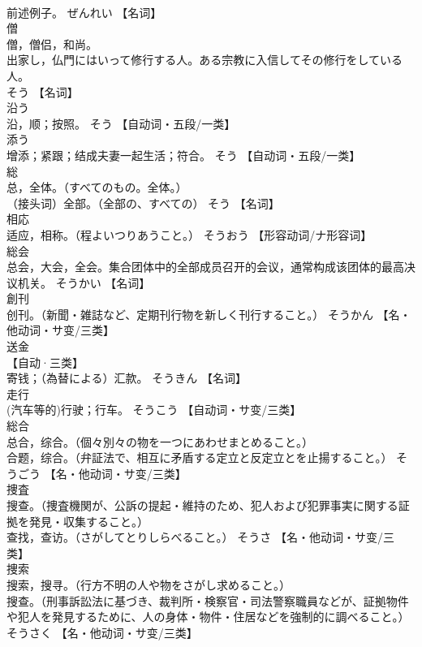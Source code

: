 \documentclass[8pt]{extreport}
\begin{document}
\begin{CJK}{UTF8}{min}
\\	前述例子。	ぜんれい		【名词】
\\	僧	
\\	僧，僧侣，和尚。
\\	出家し，仏門にはいって修行する人。ある宗教に入信してその修行をしている人。 
\\	そう		【名词】
\\	沿う	
\\	沿，顺；按照。	そう		【自动词・五段/一类】
\\	添う	
\\	增添；紧跟；结成夫妻一起生活；符合。	そう		【自动词・五段/一类】
\\	総	
\\	总，全体。（すべてのもの。全体。） 
\\	（接头词）全部。（全部の、すべての）	そう		【名词】
\\	相応	
\\	适应，相称。（程よいつりあうこと。）	そうおう		【形容动词/ナ形容词】
\\	総会	
\\	总会，大会，全会。集合团体中的全部成员召开的会议，通常构成该团体的最高决议机关。	そうかい		【名词】
\\	創刊	
\\	创刊。（新聞・雑誌など、定期刊行物を新しく刊行すること。）	そうかん		【名・他动词・サ变/三类】
\\	送金	
\\	【自动·三类】 
\\	寄钱；（為替による）汇款。	そうきん		【名词】
\\	走行	
\\	(汽车等的)行驶；行车。	そうこう		【自动词・サ变/三类】
\\	総合	
\\	总合，综合。（個々別々の物を一つにあわせまとめること。） 
\\	合题，综合。（弁証法で、相互に矛盾する定立と反定立とを止揚すること。）	そうごう		【名・他动词・サ变/三类】
\\	捜査	
\\	搜查。（捜査機関が、公訴の提起・維持のため、犯人および犯罪事実に関する証拠を発見・収集すること。） 
\\	查找，查访。（さがしてとりしらべること。）	そうさ		【名・他动词・サ变/三类】
\\	捜索	
\\	搜索，搜寻。（行方不明の人や物をさがし求めること。） 
\\	搜查。（刑事訴訟法に基づき、裁判所・検察官・司法警察職員などが、証拠物件や犯人を発見するために、人の身体・物件・住居などを強制的に調べること。）	そうさく		【名・他动词・サ变/三类】

\end{CJK}
\end{document}
